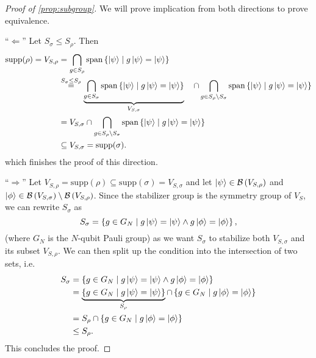 \begin{proof}[Proof of \cref{prop:subgroup}]
  We will prove implication from both directions to prove equivalence.

  \enquote{$\Leftarrow$} Let $S_\sigma \leq S_\rho$. Then
  \begin{align*}
    \mathrm{supp}(\rho) = V_{S,\rho} &= \bigcap_{g\in S_\rho} \mathrm{span}\left\{ \ket{\psi} \mid
    g\ket{\psi} = \ket{\psi} \right\} \\
        &\overset{S_\sigma \leq S_\rho}{=} \underbrace{\bigcap_{g\in S_\sigma}
        \mathrm{span}\left\{\ket{\psi} \mid g \ket{\psi} =
        \ket{\psi}\right\}}_{V_{S,\sigma}}\ \ \ \cap \bigcap_{g \in S_\rho \setminus
        S_\sigma} \mathrm{span}\left\{\ket{\psi} \mid g \ket{\psi} =
        \ket{\psi}\right\}\\
        &= V_{S,\sigma} \cap \bigcap_{g \in S_\rho \setminus
        S_\sigma} \mathrm{span}\left\{\ket{\psi} \mid g \ket{\psi} =
        \ket{\psi}\right\}\\
        &\subseteq V_{S,\sigma} = \mathrm{supp}(\sigma)
  .\end{align*}
  which finishes the proof of this direction.

  \enquote{$\Rightarrow$} Let $V_{S,\rho} = \mathrm{supp}(\rho) \subseteq
  \mathrm{supp}(\sigma) = V_{S,\sigma}$ and let
  $\ket{\psi} \in \mathcal{B}\left(V_{S,\rho}\right)$ and $\ket{\phi} \in
  \mathcal{B}\left(V_{S,\sigma}\right) \setminus
  \mathcal{B}\left(V_{S,\rho}\right)$. Since the stabilizer group is the
  symmetry group of $V_S$, we can rewrite $S_\sigma$ as
  \[ 
    S_\sigma = \left\{ g \in G_N \mid g \ket{\psi} = \ket{\psi} \wedge g\ket{\phi} =
  \ket{\phi} \right\},
  \]
  (where $G_N$ is the $N$-qubit Pauli group) 
  as we want $S_\sigma$ to stabilize both $V_{S,\sigma}$ and its subset
  $V_{S,\rho}$. We can then split up the condition into the intersection of two
  sets, i.e.
  \begin{align*}
    S_\sigma &= \left\{ g \in G_N \mid g \ket{\psi} = \ket{\psi} \wedge g\ket{\phi} =
  \ket{\phi} \right\}\\
             &= \underbrace{\left\{ g \in G_N \mid g\ket{\psi}= \ket{\psi}
             \right\}}_{S_\rho} \cap \left\{ g \in G_N \mid g\ket{\phi} = \ket{\phi} \right\} \\
             &= S_\rho \cap \left\{ g \in G_N \mid g\ket{\phi} = \ket{\phi} \right\} \\
               &\leq S_\rho 
  .\end{align*}
  This concludes the proof.
\end{proof}

